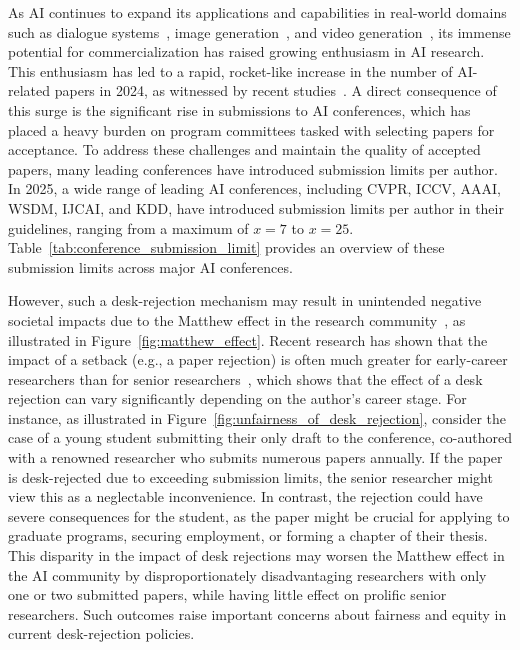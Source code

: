 As AI continues to expand its applications and capabilities in real-world domains such as dialogue systems~\cite{szk+22,aaa+23,a24}, image generation~\cite{hja20,sme20,wsd+24,wcz+23,wxz+24}, and video generation~\cite{hsg+22,bdk+23}, its immense potential for commercialization has raised growing enthusiasm in AI research. This enthusiasm has led to a rapid, rocket-like increase in the number of AI-related papers in 2024, as witnessed by recent studies~\cite{stanford_ai_index}. A direct consequence of this surge is the significant rise in submissions to AI conferences, which has placed a heavy burden on program committees tasked with selecting papers for acceptance. To address these challenges and maintain the quality of accepted papers, many leading conferences have introduced submission limits per author. In 2025, a wide range of leading AI conferences, including CVPR, ICCV, AAAI, WSDM, IJCAI, and KDD, have introduced submission limits per author in their guidelines, ranging from a maximum of $x=7$ to $x=25$. Table~\ref{tab:conference_submission_limit} provides an overview of these submission limits across major AI conferences.

However, such a desk-rejection mechanism may result in unintended negative societal impacts due to the Matthew effect in the research community~\cite{bvr18}, as illustrated in Figure~\ref{fig:matthew_effect}. Recent research has shown that the impact of a setback (e.g., a paper rejection) is often much greater for early-career researchers than for senior researchers~\cite{wjw19,scl23}, which shows that the effect of a desk rejection can vary significantly depending on the author’s career stage. For instance, as illustrated in Figure~\ref{fig:unfairness_of_desk_rejection}, consider the case of a young student submitting their only draft to the conference, co-authored with a renowned researcher who submits numerous papers annually. If the paper is desk-rejected due to exceeding submission limits, the senior researcher might view this as a neglectable inconvenience. In contrast, the rejection could have severe consequences for the student, as the paper might be crucial for applying to graduate programs, securing employment, or forming a chapter of their thesis. This disparity in the impact of desk rejections may worsen the Matthew effect in the AI community by disproportionately disadvantaging researchers with only one or two submitted papers, while having little effect on prolific senior researchers. Such outcomes raise important concerns about fairness and equity in current desk-rejection policies.

